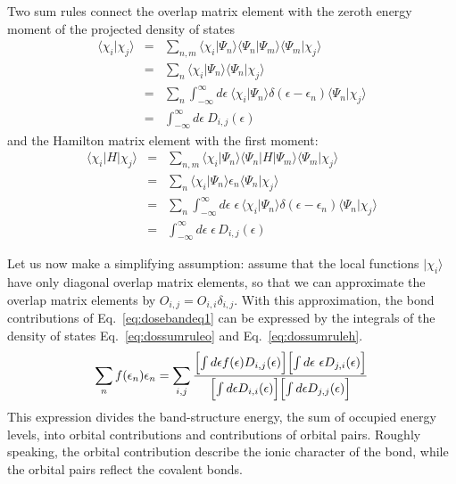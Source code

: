 \documentclass[final,12pt]{article}
\begin{document}
{{{{{{Two sum rules connect the overlap matrix element
with the zeroth energy moment of the projected density of states
\begin{eqnarray}
\langle\chi_i|\chi_j\rangle&=&\sum_{n,m}
\langle\chi_i|\Psi_n\rangle\langle\Psi_n|\Psi_m\rangle\langle\Psi_m|\chi_j\rangle
\nonumber\\
&=&\sum_{n}\langle\chi_i|\Psi_n\rangle   \langle\Psi_n|\chi_j\rangle
\nonumber\\
&=&\sum_{n}\int_{-\infty}^{\infty} d\epsilon\ 
\langle\chi_i|\Psi_n\rangle\delta(\epsilon-\epsilon_n)
\langle\Psi_n|\chi_j\rangle
\nonumber\\
&=&\int_{-\infty}^{\infty} d\epsilon\  D_{i,j}(\epsilon)
\label{eq:dossumruleo}
\end{eqnarray}
and the Hamilton matrix element with the first moment:
\begin{eqnarray}
\langle\chi_i|H|\chi_j\rangle&=&\sum_{n,m}
\langle\chi_i|\Psi_n\rangle\langle\Psi_n|H|\Psi_m\rangle\langle\Psi_m|\chi_j\rangle
\nonumber\\
&=&\sum_{n}\langle\chi_i|\Psi_n\rangle  \epsilon_n \langle\Psi_n|\chi_j\rangle
\nonumber\\
&=&\sum_{n}\int_{-\infty}^{\infty} d\epsilon\;\epsilon\,
\langle\chi_i|\Psi_n\rangle\delta(\epsilon-\epsilon_n)
\langle\Psi_n|\chi_j\rangle
\nonumber\\
&=&\int_{-\infty}^{\infty} d\epsilon\;\epsilon\, D_{i,j}(\epsilon)
\label{eq:dossumruleh}
\end{eqnarray}

Let us now make a simplifying assumption: assume that the local
functions $|\chi_i\rangle$ have only diagonal overlap matrix elements,
so that we can approximate the overlap matrix elements by
$O_{i,j}=O_{i,i}\delta_{i,j}$.  With this approximation, the bond
contributions of Eq.~\ref{eq:dosebandeq1} can be expressed by the
integrals of the density of states Eq.~\ref{eq:dossumruleo} and
Eq.~\ref{eq:dossumruleh}.
\begin{eqnarray}
\sum_n f(\epsilon_n)\epsilon_n =
\sum_{i,j}\frac{
\Bigl[\int d\epsilon f(\epsilon) D_{i,j}(\epsilon)\Bigr]
\Bigl[\int d\epsilon\ \epsilon  D_{j,i}(\epsilon)\Bigr]
}
{
\Bigl[\int d\epsilon D_{i,i}(\epsilon)\Bigr]
\Bigl[\int d\epsilon  D_{j,j}(\epsilon)\Bigr]
}
\label{eq:dosebandfromenergyintegrals}
\end{eqnarray}
This expression divides the band-structure energy, the sum of occupied
energy levels, into orbital contributions and contributions of orbital
pairs. Roughly speaking, the orbital contribution describe the ionic
character of the bond, while the orbital pairs reflect the covalent
bonds.


}}}}}}
\end{document}
